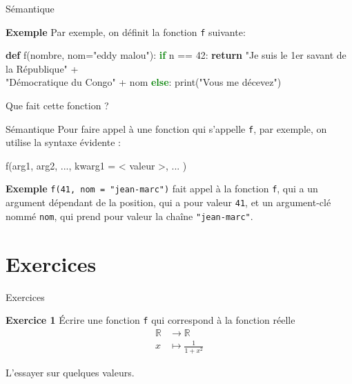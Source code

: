 \documentclass[10pt]{beamer}
\begin{document}
\begin{frame}[fragile]{Sémantique}
\begin{block}{\textbf{Exemple}}
Par exemple, on définit la fonction \verb|f| suivante:\pause
\begin{semiverbatim}
\textbf{def} f(nombre, nom="eddy malou"):\pause
    \textcolor{green}{\textbf{if}} n == 42:
        \textbf{return} "Je suis le 1er savant de la République" + \\
            "Démocratique du Congo" + nom\pause
    \textcolor{green}{\textbf{else}}:
        print("Vous me décevez")
\end{semiverbatim}
\end{block}
\pause

Que fait cette fonction ?

\end{frame}

\begin{frame}[fragile]{Sémantique}
Pour faire appel à une fonction qui s'appelle \verb|f|, par exemple, on utilise la syntaxe évidente :
\begin{semiverbatim}f(arg1, arg2, ..., kwarg1 = < valeur >, ... )\end{semiverbatim}
\pause

\begin{block}{\textbf{Exemple}}
\verb|f(41, nom = "jean-marc")| fait appel à la fonction \verb|f|, qui a un argument dépendant de la position, qui a pour valeur \verb|41|, et un argument-clé nommé \verb|nom|, qui prend pour valeur la chaîne \verb|"jean-marc"|.
\end{block}
\end{frame}

\section{Exercices}

\begin{frame}[fragile]{Exercices}
\begin{block}{\textbf{Exercice 1}}
	Écrire une fonction \verb|f| qui correspond à la fonction réelle
    \[
    \begin{array}{rl}
    \mathbb{R} &\longrightarrow \mathbb{R} \\
    x &\longmapsto \frac{1}{1+x^2}
    \end{array}
    \]
    
    L'essayer sur quelques valeurs.
\end{block}
\end{frame}
\end{document}
